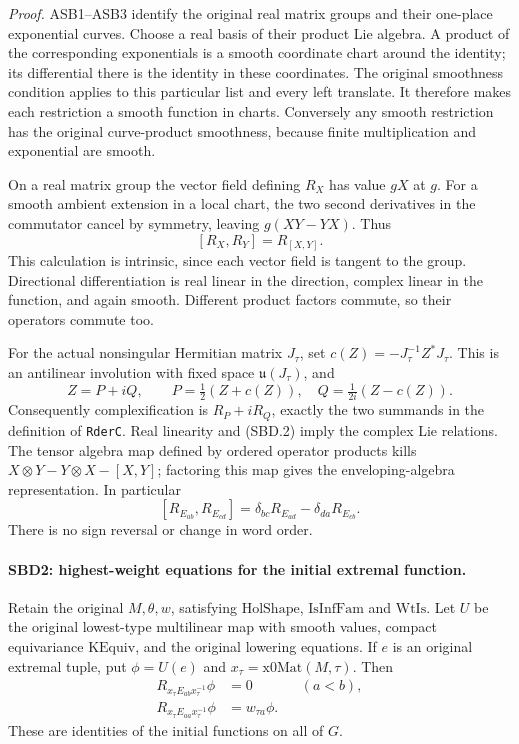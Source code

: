 \documentclass[11pt,a4paper]{article}
\numberwithin{equation}{section}
\theoremstyle{remark}\newtheorem{remark}[theorem]{Remark}
\begin{document}
\emph{Proof.}
ASB1--ASB3 identify the original real matrix groups and their
one-place exponential curves.  Choose a real basis of their product
Lie algebra.  A product of the corresponding exponentials is a
smooth coordinate chart around the identity; its differential there
is the identity in these coordinates.  The original smoothness
condition applies to this particular list and every left translate.
It therefore makes each restriction a smooth function in charts.
Conversely any smooth restriction has the original curve-product
smoothness, because finite multiplication and exponential are smooth.

On a real matrix group the vector field defining \(R_X\) has value
\(gX\) at \(g\).  For a smooth ambient extension in a local chart,
the two second derivatives in the commutator cancel by symmetry,
leaving \(g(XY-YX)\).  Thus
\[
 [R_X,R_Y]=R_{[X,Y]}.
 \tag{SBD.2}
\]
This calculation is intrinsic, since each vector field is tangent
to the group.  Directional differentiation is real linear in the
direction, complex linear in the function, and again smooth.
Different product factors commute, so their operators commute too.

For the actual nonsingular Hermitian matrix \(J_\tau\), set
\(c(Z)=-J_\tau^{-1}Z^*J_\tau\).  This is an antilinear involution
with fixed space \(\mathfrak u(J_\tau)\), and
\[
 Z=P+iQ,\qquad P=\tfrac12(Z+c(Z)),\quad
 Q=\tfrac1{2i}(Z-c(Z)).
 \tag{SBD.3}
\]
Consequently complexification is \(R_P+iR_Q\), exactly the two
summands in the definition of \texttt{Rder\allowbreak C}.  Real linearity and
(SBD.2) imply the complex Lie relations.  The tensor algebra map
defined by ordered operator products kills
\(X\otimes Y-Y\otimes X-[X,Y]\); factoring this map gives the
enveloping-algebra representation.  In particular
\[
 [R_{E_{ab}},R_{E_{cd}}]
   =\delta_{bc}R_{E_{ad}}-\delta_{da}R_{E_{cb}}.
 \tag{SBD.4}
\]
There is no sign reversal or change in word order.

\paragraph{SBD2: highest-weight equations for the initial extremal function.}
\label{claim:SBD2}
Retain the original \(M,\theta,w\), satisfying
\(\mathrm{HolShape}\), \(\mathrm{IsInfFam}\) and \(\mathrm{WtIs}\).
Let \(U\) be the original lowest-type multilinear map with smooth
values, compact equivariance \(\mathrm{KEquiv}\), and the original
lowering equations.  If \(e\) is an original extremal tuple, put
\(\phi=U(e)\) and \(x_\tau=\mathrm{x0Mat}(M,\tau)\).  Then
\[
 \begin{aligned}
 R_{x_\tau E_{ab}x_\tau^{-1}}\phi&=0 &&(a<b),\\
 R_{x_\tau E_{aa}x_\tau^{-1}}\phi&=w_{\tau a}\phi.
 \end{aligned}
 \tag{SBD.5}
\]
These are identities of the initial functions on all of \(G\).
\end{document}
